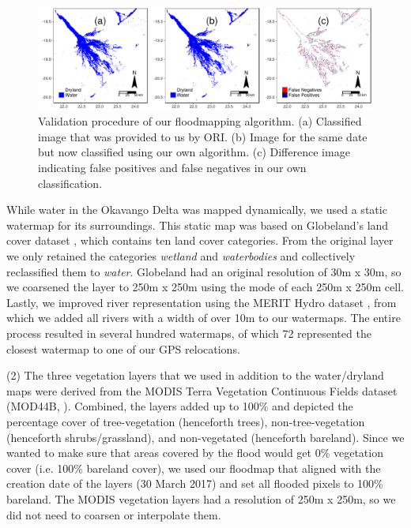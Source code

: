 \documentclass[abstract=on,10pt,a4paper,bibliography=totocnumbered]{scrartcl}
\begin{document}
\begin{figure}[ht]
  \begin{center}
    \includegraphics[width = \textwidth]{99_FloodmappingValidation.pdf}
    \caption{Validation procedure of our floodmapping algorithm. (a) Classified
    image that was provided to us by ORI. (b) Image for the same date but now
    classified using our own algorithm. (c) Difference image indicating false
    positives and false negatives in our own classification.}
    \label{FloodmappingValidation}
  \end{center}
\end{figure}

\noindent While water in the Okavango Delta was mapped dynamically, we used a
static watermap for its surroundings. This static map was based on Globeland's
land cover dataset \citep{Chen.2015}, which contains ten land cover categories.
From the original layer we only retained the categories \textit{wetland} and
\textit{waterbodies} and collectively reclassified them to \textit{water}.
Globeland had an original resolution of 30m x 30m, so we coarsened the layer to
250m x 250m using the mode of each 250m x 250m cell. Lastly, we improved river
representation using the MERIT Hydro dataset \citep{Yamazaki.2019}, from which
we added all rivers with a width of over 10m to our watermaps. The entire
process resulted in several hundred watermaps, of which 72 represented the
closest watermap to one of our GPS relocations.

(2) The three vegetation layers that we used in addition to the water/dryland
maps were derived from the MODIS Terra Vegetation Continuous Fields dataset
(MOD44B, \cite{Dimiceli.2015}). Combined, the layers added up to 100\% and
depicted the percentage cover of tree-vegetation (henceforth trees),
non-tree-vegetation (henceforth shrubs/grassland), and non-vegetated (henceforth
bareland). Since we wanted to make sure that areas covered by the flood would
get 0\% vegetation cover (i.e. 100\% bareland cover), we used our floodmap that
aligned with the creation date of the layers (30 March 2017) and set all flooded
pixels to 100\% bareland. The MODIS vegetation layers had a resolution of 250m x
250m, so we did not need to coarsen or interpolate them.
\end{document}
